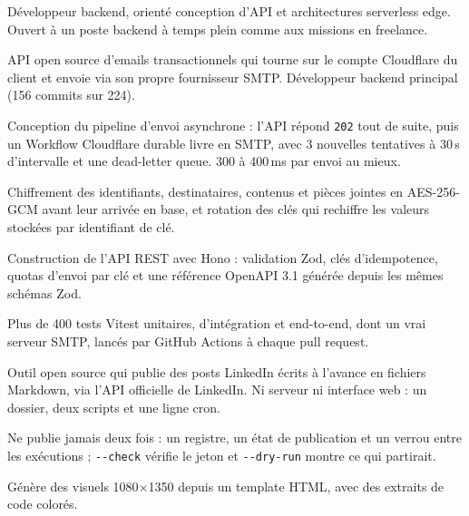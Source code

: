 \documentclass[10pt]{article}
\begin{document}

Développeur backend, orienté conception d'API et architectures serverless edge.
Ouvert à un poste backend à temps plein comme aux missions en freelance.

API open source d'emails transactionnels qui tourne sur le compte Cloudflare du client et envoie via
son propre fournisseur SMTP. Développeur backend principal (156 commits sur 224).
\begin{cvitems}
  \item Conception du pipeline d'envoi asynchrone : l'API répond \texttt{202} tout de suite, puis un
        Workflow Cloudflare durable livre en SMTP, avec 3 nouvelles tentatives à 30\,s d'intervalle et
        une dead-letter queue. 300 à 400\,ms par envoi au mieux.
  \item Chiffrement des identifiants, destinataires, contenus et pièces jointes en AES-256-GCM avant
        leur arrivée en base, et rotation des clés qui rechiffre les valeurs stockées par
        identifiant de clé.
  \item Construction de l'API REST avec Hono : validation Zod, clés d'idempotence, quotas d'envoi par clé
        et une référence OpenAPI 3.1 générée depuis les mêmes schémas Zod.
  \item Plus de 400 tests Vitest unitaires, d'intégration et end-to-end, dont un
        vrai serveur SMTP, lancés par GitHub Actions à chaque pull request.
\end{cvitems}

Outil open source qui publie des posts LinkedIn écrits à l'avance en fichiers Markdown, via l'API
officielle de LinkedIn. Ni serveur ni interface web : un dossier, deux scripts et une ligne cron.
\begin{cvitems}
  \item Ne publie jamais deux fois : un registre, un état de publication et un verrou entre les
        exécutions ; \texttt{-{}-check} vérifie le jeton et \texttt{-{}-dry-run} montre ce qui partirait.
  \item Génère des visuels 1080$\times$1350 depuis un template HTML, avec des extraits de code colorés.
\end{cvitems}
\end{document}
